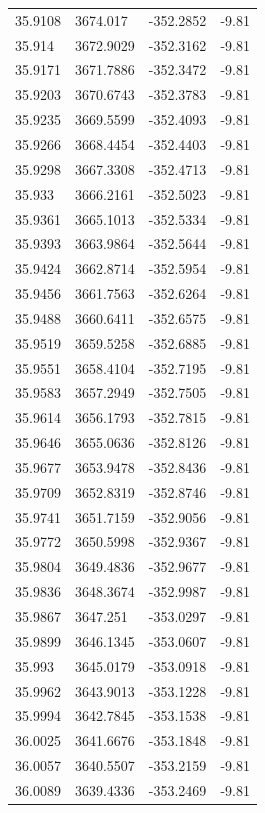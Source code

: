 \begin{table}[H]
\begin{tabular}{llll}
35.9108 & 3674.017 & -352.2852 & -9.81 \\
35.914 & 3672.9029 & -352.3162 & -9.81 \\
35.9171 & 3671.7886 & -352.3472 & -9.81 \\
35.9203 & 3670.6743 & -352.3783 & -9.81 \\
35.9235 & 3669.5599 & -352.4093 & -9.81 \\
35.9266 & 3668.4454 & -352.4403 & -9.81 \\
35.9298 & 3667.3308 & -352.4713 & -9.81 \\
35.933 & 3666.2161 & -352.5023 & -9.81 \\
35.9361 & 3665.1013 & -352.5334 & -9.81 \\
35.9393 & 3663.9864 & -352.5644 & -9.81 \\
35.9424 & 3662.8714 & -352.5954 & -9.81 \\
35.9456 & 3661.7563 & -352.6264 & -9.81 \\
35.9488 & 3660.6411 & -352.6575 & -9.81 \\
35.9519 & 3659.5258 & -352.6885 & -9.81 \\
35.9551 & 3658.4104 & -352.7195 & -9.81 \\
35.9583 & 3657.2949 & -352.7505 & -9.81 \\
35.9614 & 3656.1793 & -352.7815 & -9.81 \\
35.9646 & 3655.0636 & -352.8126 & -9.81 \\
35.9677 & 3653.9478 & -352.8436 & -9.81 \\
35.9709 & 3652.8319 & -352.8746 & -9.81 \\
35.9741 & 3651.7159 & -352.9056 & -9.81 \\
35.9772 & 3650.5998 & -352.9367 & -9.81 \\
35.9804 & 3649.4836 & -352.9677 & -9.81 \\
35.9836 & 3648.3674 & -352.9987 & -9.81 \\
35.9867 & 3647.251 & -353.0297 & -9.81 \\
35.9899 & 3646.1345 & -353.0607 & -9.81 \\
35.993 & 3645.0179 & -353.0918 & -9.81 \\
35.9962 & 3643.9013 & -353.1228 & -9.81 \\
35.9994 & 3642.7845 & -353.1538 & -9.81 \\
36.0025 & 3641.6676 & -353.1848 & -9.81 \\
36.0057 & 3640.5507 & -353.2159 & -9.81 \\
36.0089 & 3639.4336 & -353.2469 & -9.81 \\

\end{tabular}
\end{table}
